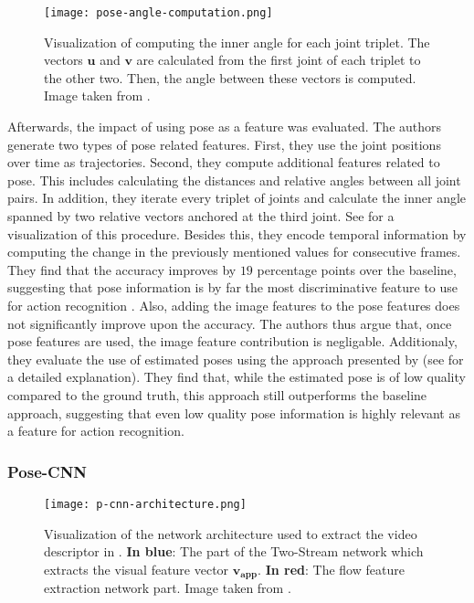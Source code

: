 \begin{figure}[htb!]
    \centering
    \texttt{[image: pose-angle-computation.png]}
    \caption{Visualization of computing the inner angle for each joint triplet. The vectors $\bm{u}$ and $\bm{v}$ are calculated from the first joint of each triplet to the other two. Then, the angle between these vectors is computed. Image taken from \cite{jhuang_towards_2013}. }
    \label{fig:joint-angle-computation}
\end{figure}

Afterwards, the impact of using pose as a feature was evaluated.
The authors generate two types of pose related features. 
First, they use the joint positions over time as trajectories. 
Second, they compute additional features related to pose.
This includes calculating the distances and relative angles between all joint pairs. 
In addition, they iterate every triplet of joints and calculate the inner angle spanned by two relative vectors anchored at the third joint.
See  for a visualization of this procedure.
Besides this, they encode temporal information by computing the change in the previously mentioned values for consecutive frames.
They find that the accuracy improves by $19$ percentage points over the baseline, suggesting that pose information is by far the most discriminative feature to use for action recognition \cite{jhuang_towards_2013}. 
Also, adding the image features to the pose features does not significantly improve upon the accuracy. 
The authors thus argue that, once pose features are used, the image feature contribution is negligable.
Additionaly, they evaluate the use of estimated poses using the approach presented by \cite{yang_articulated_2011} (see  for a detailed explanation). 
They find that, while the estimated pose is of low quality compared to the ground truth, this approach still outperforms the baseline approach, suggesting that even low quality pose information is highly relevant as a feature for action recognition.

\subsubsection{Pose-CNN}
\label{sec:pcnn}

\begin{figure}[htb!]
    \centering
    \texttt{[image: p-cnn-architecture.png]}
    \caption{Visualization of the network architecture used to extract the video descriptor in \cite{cheron_pcnn_2015}. \textbf{In blue}: The part of the Two-Stream network which extracts the visual feature vector $\bm{v_{app}}$. \textbf{In red}: The flow feature extraction network part. Image taken from \cite{cheron_pcnn_2015}. }
    \label{fig:p-cnn-architecture}
\end{figure}

